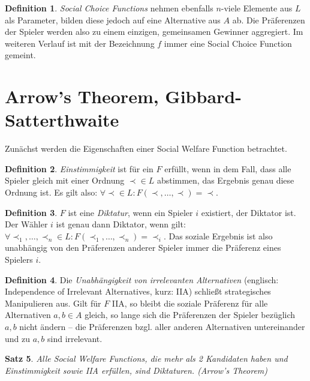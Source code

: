 \documentclass[a4paper,11pt]{article}
\theoremstyle{definition}
\newtheorem{definition}{Definition}
\theoremstyle{plain}
\newtheorem{theorem}[definition]{Satz}
\theoremstyle{definition}
\begin{document}
\begin{definition}
	\label{def:socialchoicefunc}
	\emph{Social Choice Functions} nehmen ebenfalls $n$-viele Elemente aus $L$ als Parameter, bilden diese jedoch auf eine Alternative aus $A$ ab. Die Präferenzen der Spieler werden also zu einem einzigen, gemeinsamen Gewinner aggregiert. Im weiteren Verlauf ist mit der Bezeichnung $f$ immer eine Social Choice Function gemeint.
\end{definition}

\section{Arrow's Theorem, Gibbard-Satterthwaite}
Zunächst werden die Eigenschaften einer Social Welfare Function betrachtet.

\begin{definition}
	\label{def:einstimmigkeit}
	\emph{Einstimmigkeit} ist für ein $F$ erfüllt, wenn in dem Fall, dass alle Spieler gleich mit einer Ordnung $\prec \in L$ abstimmen, das Ergebnis genau diese Ordnung ist. Es gilt also: $\forall \prec \in L: F(\prec, \ldots,\prec) = \prec$.
\end{definition}

\begin{definition}
	\label{def:diktatur}
	$F$ ist eine \emph{Diktatur}, wenn ein Spieler $i$ existiert, der Diktator ist. Der Wähler $i$ ist genau dann Diktator, wenn gilt: $\forall \prec_1, \ldots, \prec_n \in L: F(\prec_1, \ldots, \prec_n) = \prec_i$. Das soziale Ergebnis ist also unabhängig von den Präferenzen anderer Spieler immer die Präferenz eines Spielers $i$.
\end{definition}

\begin{definition}
	\label{def:IIA}
	Die \emph{Unabhängigkeit von irrelevanten Alternativen} (englisch: Independence of Irrelevant Alternatives, kurz: IIA) schließt strategisches Manipulieren aus. Gilt für $F$ IIA, so bleibt die soziale Präferenz für alle Alternativen $a, b \in A$ gleich, so lange sich die Präferenzen der Spieler bezüglich $a, b$ nicht ändern -- die  Präferenzen bzgl. aller anderen Alternativen untereinander und zu $a, b$ sind irrelevant.
\end{definition}

\begin{theorem}
	Alle Social Welfare Functions, die mehr als 2 Kandidaten haben und Einstimmigkeit sowie IIA erfüllen, sind Diktaturen. (Arrow's Theorem)
\end{theorem}
\end{document}
